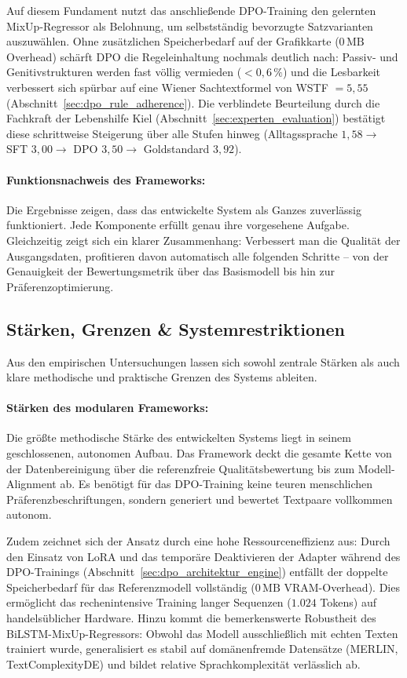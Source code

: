 Auf diesem Fundament nutzt das anschließende DPO-Training den gelernten MixUp-Regressor als Belohnung, um selbstständig bevorzugte Satzvarianten auszuwählen. Ohne zusätzlichen Speicherbedarf auf der Grafikkarte ($0\,\text{MB}$ Overhead) schärft DPO die Regeleinhaltung nochmals deutlich nach: Passiv- und Genitivstrukturen werden fast völlig vermieden ($< 0{,}6\,\%$) und die Lesbarkeit verbessert sich spürbar auf eine Wiener Sachtextformel von WSTF $= 5{,}55$ (Abschnitt~\ref{sec:dpo_rule_adherence}). Die verblindete Beurteilung durch die Fachkraft der Lebenshilfe Kiel (Abschnitt~\ref{sec:experten_evaluation}) bestätigt diese schrittweise Steigerung über alle Stufen hinweg (Alltagssprache $1{,}58 \to$ SFT $3{,}00 \to$ DPO $3{,}50 \to$ Goldstandard $3{,}92$).

\paragraph{Funktionsnachweis des Frameworks:}
Die Ergebnisse zeigen, dass das entwickelte System als Ganzes zuverlässig funktioniert. Jede Komponente erfüllt genau ihre vorgesehene Aufgabe. Gleichzeitig zeigt sich ein klarer Zusammenhang: Verbessert man die Qualität der Ausgangsdaten, profitieren davon automatisch alle folgenden Schritte – von der Genauigkeit der Bewertungsmetrik über das Basismodell bis hin zur Präferenzoptimierung.

\subsection{Stärken, Grenzen \& Systemrestriktionen}
\label{sec:diskussion_grenzen}

Aus den empirischen Untersuchungen lassen sich sowohl zentrale Stärken als auch klare methodische und praktische Grenzen des Systems ableiten.

\paragraph{Stärken des modularen Frameworks:}
Die größte methodische Stärke des entwickelten Systems liegt in seinem geschlossenen, autonomen Aufbau. Das Framework deckt die gesamte Kette von der Datenbereinigung über die referenzfreie Qualitätsbewertung bis zum Modell-Alignment ab. Es benötigt für das DPO-Training keine teuren menschlichen Präferenzbeschriftungen, sondern generiert und bewertet Textpaare vollkommen autonom. 

Zudem zeichnet sich der Ansatz durch eine hohe Ressourceneffizienz aus: Durch den Einsatz von LoRA und das temporäre Deaktivieren der Adapter während des DPO-Trainings (Abschnitt~\ref{sec:dpo_architektur_engine}) entfällt der doppelte Speicherbedarf für das Referenzmodell vollständig ($0\,\text{MB}$ VRAM-Overhead). Dies ermöglicht das rechenintensive Training langer Sequenzen ($1.024$ Tokens) auf handelsüblicher Hardware. Hinzu kommt die bemerkenswerte Robustheit des BiLSTM-MixUp-Regressors: Obwohl das Modell ausschließlich mit echten Texten trainiert wurde, generalisiert es stabil auf domänenfremde Datensätze (MERLIN, TextComplexityDE) und bildet relative Sprachkomplexität verlässlich ab.

